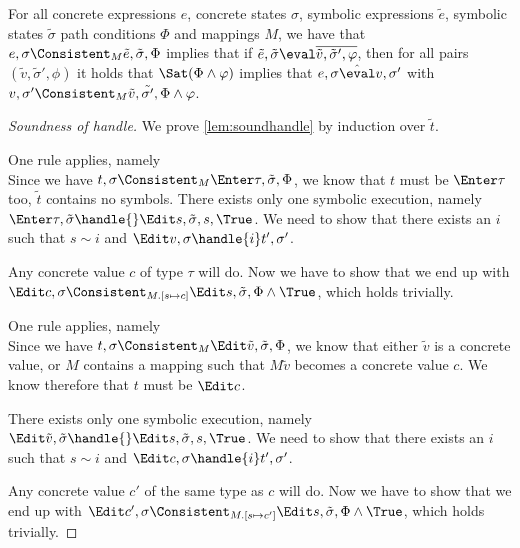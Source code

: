 \begin{lemma}
  \label{lem:soundeval}
  For all concrete expressions $e$, concrete states $\sigma$, symbolic expressions $\tilde{e}$, symbolic states $\tilde{\sigma}$ path conditions $\Phi$ and mappings $M$,
  we have that $e,\sigma\Consistent_{M}\tilde{e},\tilde{\sigma},\Phi$ implies
  that if $\tilde{e},\tilde{\sigma}\eval\overline{\tilde{v},\tilde{\sigma}',\phi}$,
  then for all pairs $(\tilde{v},\tilde{\sigma}',\phi)$ it holds that $\Sat(\Phi\land\phi)$ implies
  that $e,\sigma\hat{\eval}v,\sigma'$ with $v,\sigma'\Consistent_{M}\tilde{v},\tilde{\sigma'},\Phi\land\phi$.
\end{lemma}


\begin{proof}[Soundness of handle]

  We prove \cref{lem:soundhandle} by induction over $\tilde{t}$.

 {One rule applies, namely \\
 Since we have $t,\sigma\Consistent_M\Enter \tau,\tilde{\sigma},\Phi$, we know that $t$ must be $\Enter \tau$ too, $\tilde{t}$ contains no symbols.
 There exists only one symbolic execution, namely $\Enter \tau,\tilde{\sigma}\handle{}\Edit s,\tilde{\sigma},s,\True$.
 We need to show that there exists an $i$ such that $s\sim i$ and $\Edit v,\sigma\handle{i}t',\sigma'$.

 Any concrete value $c$ of type $\tau$ will do. Now we have to show that we end up with $\Edit c,\sigma\Consistent_{M.[s\mapsto c]}\Edit s,\tilde{\sigma},\Phi\land\True$, which holds trivially.
 }

  {One rule applies, namely \\
  Since we have $t,\sigma\Consistent_M\Edit \tilde{v},\tilde{\sigma},\Phi$, we know that either $\tilde{v}$ is a concrete value, or $M$ contains a mapping such that $M\tilde{v}$ becomes a concrete value $c$. We know therefore that $t$ must be $\Edit c$.

  There exists only one symbolic execution, namely $\Edit \tilde{v},\tilde{\sigma}\handle{}\Edit s,\tilde{\sigma},s,\True$.
  We need to show that there exists an $i$ such that $s\sim i$ and $\Edit c,\sigma\handle{i}t',\sigma'$.

  Any concrete value $c'$ of the same type as $c$ will do. Now we have to show that we end up with $\Edit c',\sigma\Consistent_{M.[s\mapsto c']}\Edit s,\tilde{\sigma},\Phi\land\True$, which holds trivially.
  }



\end{proof}
